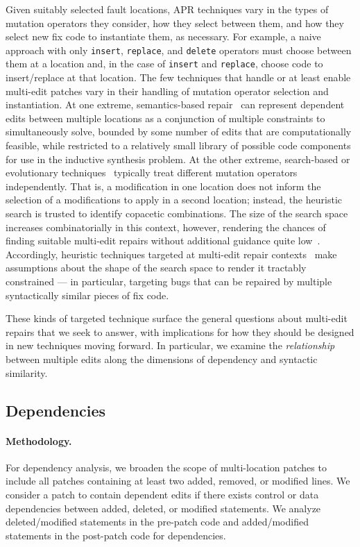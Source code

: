 \documentclass[sigconf, timestamp-false, anonymous=true]{acmart}
\begin{document}
Given suitably selected fault locations, APR techniques vary in the types of
mutation operators they consider, how they select between them, and how they
select new fix code to instantiate them, as necessary.  For example, a naive
approach with only \texttt{insert}, \texttt{replace}, and \texttt{delete}
operators must choose between them at a location and, in the case of
\texttt{insert} and \texttt{replace}, choose code to insert/replace at that
location.  
%
The few techniques that handle or at least enable multi-edit patches vary in their
handling of mutation operator selection and instantiation.  At one
extreme, semantics-based repair~\cite{s3,angelix} can represent dependent edits between multiple
locations as a conjunction of multiple constraints to simultaneously solve,
bounded by some number of edits that are computationally feasible, while
restricted to a relatively small library of possible code components for use in
the inductive synthesis problem.    At the other extreme, search-based or
evolutionary techniques~\cite{genprog,others} typically treat different mutation
operators independently.  That is, a modification in one location does not
inform the selection of a modifications to apply in a second location; instead,
the heuristic search is trusted to identify copacetic combinations.  The size of
the search space increases combinatorially in this context, however, rendering
the chances of finding suitable multi-edit repairs without additional guidance
quite low~\cite{ae,long2016}. Accordingly, heuristic techniques targeted at multi-edit
repair contexts~\cite{hercules,maybewang2018} make assumptions about the
shape of the search space to render it tractably constrained --- in particular,
targeting bugs that can be repaired by multiple syntactically similar pieces of
fix code.

These kinds of targeted technique surface the general questions about
multi-edit repairs that we seek to answer, with
implications for how they should be designed in new techniques moving forward.
In particular, we examine the \emph{relationship} between multiple edits 
along the dimensions of dependency and syntactic similarity.

\subsection{Dependencies}


\paragraph{Methodology.} 
For dependency analysis, we broaden the scope of multi-location patches to 
include all patches containing at least two added, removed, or modified lines.
We consider a patch to contain dependent edits if there exists 
control or data dependencies between added, deleted, or modified statements.
We analyze deleted/modified statements in the pre-patch code 
and added/modified statements in the post-patch code for dependencies.
  
\end{document}
